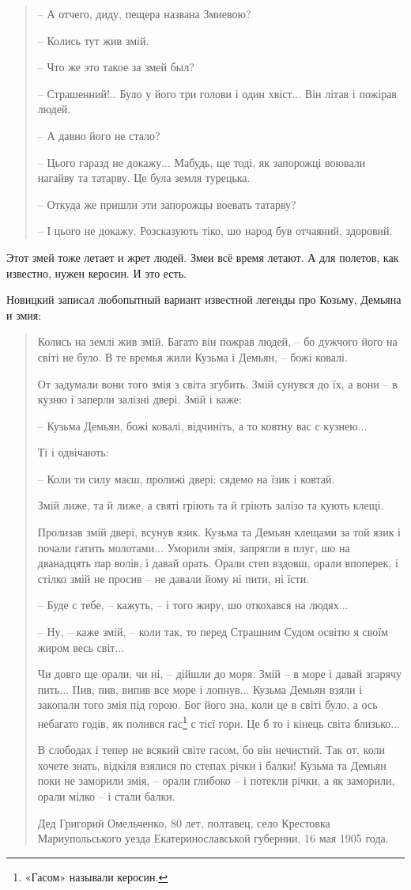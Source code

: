 \begin{quotation}
 – А отчего, диду, пещера названа Змиевою?

 – Колись тут жив змій.

 – Что же это такое за змей был?

 – Страшенний!.. Було у його три голови і один хвіст... Він літав і пожірав людей.

 – А давно його не стало?

 – Цього гаразд не докажу... Мабудь, ще тоді, як запорожці воювали нагайву та татарву. Це була земля турецька.

 – Откуда же пришли эти запорожцы воевать татарву?

 – І цього не докажу. Розсказують тіко, шо народ був отчаяний, здоровий.
\end{quotation}

Этот змей тоже летает и жрет людей. Змеи всё время летают. А для полетов, как известно, нужен керосин. И это есть.

Новицкий записал любопытный вариант известной легенды про Козьму, Демьяна и змия:

\begin{quotation}
Колись на землі жив змій. Багато він пожрав людей, – бо дужчого його на світі не було. В те времья жили Кузьма і Демьян, – божі ковалі.

От задумали вони того змія з світа згубить. Змій сунувся до їх, а вони – в кузню і заперли залізні двері. Змій і каже:

   – Кузьма Демьян, божі ковалі, відчиніть, а то ковтну вас с кузнею...

Ті і одвічають:

   – Коли ти силу маєш, пролижі двері: сядемо на їзик і ковтай.

Змій лиже, та й лиже, а святі гріють та й гріють залізо та кують клещі.

Пролизав змій двері, всунув язик. Кузьма та Демьян клещами за той язик і почали гатить молотами... Уморили змія, запрягли в плуг, шо на дванадцять пар волів, і давай орать. Орали степ вздовш, орали впоперек, і стілко змій не просив – не давали йому ні пити, ні їсти.

   – Буде с тебе, – кажуть, – і того жиру, шо откохався на людях...

   – Ну, – каже змій, – коли так, то перед Страшним Судом освітю я своїм жиром весь світ...

Чи довго ще орали, чи ні, – дійшли до моря. Змій – в море і давай згарячу пить... Пив, пив, випив все море і лопнув... Кузьма Демьян взяли і закопали того змія під горою. Бог його зна, коли це в світі було, а ось
небагато годів, як полився гас\footnote{«Гасом» называли керосин.} с тієї гори. Це б то і кінець світа близько...

В слободах і тепер не всякий світе гасом, бо він нечистий. Так от, коли хочете знать, відкіля взялися по степах річки і балки! Кузьма та Демьян поки не заморили змія, – орали глибоко – і потекли річки, а як заморили, орали мілко – і стали балки.

Дед Григорий Омельченко, 80 лет, полтавец, село Крестовка Мариупольського уезда Екатеринославськой губернии, 16 мая 1905 года.
\end{quotation}

